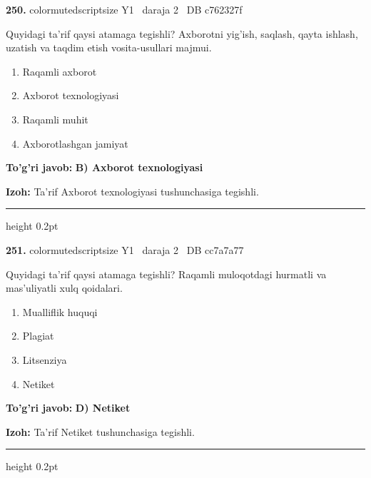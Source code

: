 \documentclass[10pt,a4paper,oneside]{article}
\begin{document}
\noindent\textbf{\color{ink}250.}  {color{muted}scriptsize Y1 \textbullet\ daraja 2 \textbullet\ DB c762327f}
\par
Quyidagi ta'rif qaysi atamaga tegishli? Axborotni yig'ish, saqlash, qayta ishlash, uzatish va taqdim etish vosita-usullari majmui.
\begin{enumerate}[label=\Alph*),leftmargin=9mm]
\item Raqamli axborot
\item Axborot texnologiyasi
\item Raqamli muhit
\item Axborotlashgan jamiyat
\end{enumerate}
\begin{tcolorbox}[enhanced,breakable,colback=teal!4,colframe=teal!50!black,boxrule=0.5pt,arc=1.1mm,left=3mm,right=3mm,top=1.7mm,bottom=1.7mm,before skip=2mm,after skip=2mm]
\textbf{\color{teal}To'g'ri javob:} \textbf{B) Axborot texnologiyasi}
\par\smallskip
\textbf{Izoh:} Ta'rif Axborot texnologiyasi tushunchasiga tegishli.
\end{tcolorbox}
\vspace{2mm}\hrule height 0.2pt \vspace{3mm}

\noindent\textbf{\color{ink}251.}  {color{muted}scriptsize Y1 \textbullet\ daraja 2 \textbullet\ DB cc7a7a77}
\par
Quyidagi ta'rif qaysi atamaga tegishli? Raqamli muloqotdagi hurmatli va mas'uliyatli xulq qoidalari.
\begin{enumerate}[label=\Alph*),leftmargin=9mm]
\item Mualliflik huquqi
\item Plagiat
\item Litsenziya
\item Netiket
\end{enumerate}
\begin{tcolorbox}[enhanced,breakable,colback=teal!4,colframe=teal!50!black,boxrule=0.5pt,arc=1.1mm,left=3mm,right=3mm,top=1.7mm,bottom=1.7mm,before skip=2mm,after skip=2mm]
\textbf{\color{teal}To'g'ri javob:} \textbf{D) Netiket}
\par\smallskip
\textbf{Izoh:} Ta'rif Netiket tushunchasiga tegishli.
\end{tcolorbox}
\vspace{2mm}\hrule height 0.2pt \vspace{3mm}
\end{document}
